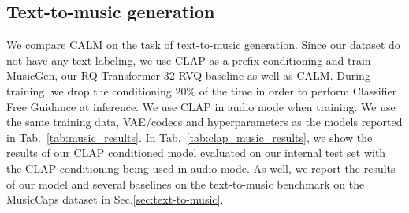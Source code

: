 \subsection{Text-to-music generation}
We compare CALM on the task of text-to-music generation. Since our dataset do not have any text labeling, we use CLAP \citep{clap} as a prefix conditioning and train MusicGen, our RQ-Transformer 32 RVQ baseline as well as CALM. During training, we drop the conditioning $20\%$ of the time in order to perform Classifier Free Guidance \citep{cfg} at inference. We use CLAP in audio mode when training. We use the same training data, VAE/codecs and hyperparameters as the models reported in Tab.~\ref{tab:music_results}. In Tab.~\ref{tab:clap_music_results}, we show the results of our CLAP conditioned model evaluated on our internal test set with the CLAP conditioning being used in audio mode. 
As well, we report the results of our model and several baselines on the text-to-music benchmark on the MusicCaps dataset \cite{musiclm} in Sec.\ref{sec:text-to-music}.

  

\begin{table}[h]
\caption{{\textbf{Text-to-music generation models} on our test set where CLAP is used in audio mode.}}
\centering
{}
\label{tab:clap_music_results}
\end{table}


